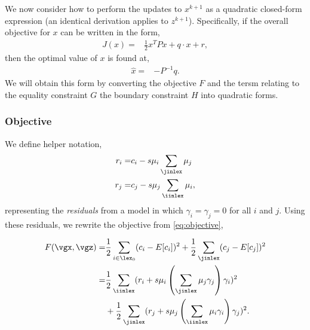 We now consider how to perform the updates to $x^{k+1}$ as a quadratic closed-form expression (an identical derivation applies to $z^{k+1}$). Specifically, if the overall objective for $x$ can be written in the form,
\begin{align}
J(x) = & \frac{1}{2}x^T P x + q \cdot x + r,
\end{align}
then the optimal value of $x$ is found at,
\begin{align}
\hat{x} = & -P^{-1} q.
\end{align}
We will obtain this form by converting the objective $F$ and the tersm relating to the equality constraint $G$ the boundary constraint $H$ into quadratic forms.

\subsubsection{Objective}
We define helper notation,
\begin{align}
r_i = & c_i - s\mu_i \sum_{\jinlex}\mu_j\\
r_j = & c_j - s\mu_j \sum_{\iinlex}\mu_i,
\end{align}
representing the \emph{residuals} from a model in which $\gamma_i = \gamma_j = 0$ for all $i$ and $j$. Using these residuals, we rewrite the objective from \autoref{eq:objective},
\begin{small}
\begin{align}
F(\vgx,\vgz) = & \frac{1}{2}\sum_{i\in \lex_0}(c_i - E[c_i])^2 + \frac{1}{2}\sum_{\jinlex}(c_j - E[c_j])^2\\
\notag = &\frac{1}{2}\sum_{\iinlex}(r_i + s \mu_i \left(\sum_{\jinlex} \mu_j \gamma_j \right) \gamma_i )^2\\
& + \frac{1}{2}\sum_{\jinlex}(r_j + s \mu_j \left(\sum_{\iinlex} \mu_i \gamma_i \right) \gamma_j )^2.
\end{align}
\end{small}

